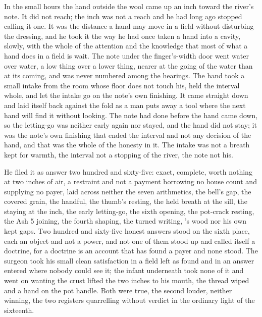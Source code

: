 In the small hours the hand outside the wool came up an inch toward the river's note. It did not reach; the inch was not a reach and he had long ago stopped calling it one. It was the distance a hand may move in a field without disturbing the dressing, and he took it the way he had once taken a hand into a cavity, slowly, with the whole of the attention and the knowledge that most of what a hand does in a field is wait. The note under the finger's-width door went water over water, a low thing over a lower thing, nearer at the going of the water than at its coming, and was never numbered among the hearings. The hand took a small intake from the room whose floor does not touch his, held the interval whole, and let the intake go on the note's own finishing. It came straight down and laid itself back against the fold as a man puts away a tool where the next hand will find it without looking. The note had done before the hand came down, so the letting-go was neither early again nor stayed, and the hand did not stay; it was the note's own finishing that ended the interval and not any decision of the hand, and that was the whole of the honesty in it. The intake was not a breath kept for warmth, the interval not a stopping of the river, the note not his.

He filed it as answer two hundred and sixty-five: exact, complete, worth nothing at two inches of air, a restraint and not a payment borrowing no house count and supplying no payer, laid across neither the seven arithmetics, the bell's gap, the covered grain, the handful, the thumb's resting, the held breath at the sill, the staying at the inch, the early letting-go, the sixth opening, the pot-crack resting, the Ash 5 joining, the fourth shaping, the turned writing, 's wood nor his own kept gaps. Two hundred and sixty-five honest answers stood on the sixth place, each an object and not a power, and not one of them stood up and called itself a doctrine, for a doctrine is an account that has found a payer and none stood. The surgeon took his small clean satisfaction in a field left as found and in an answer entered where nobody could see it; the infant underneath took none of it and went on wanting the crust lifted the two inches to his mouth, the thread wiped and a hand on the pot handle. Both were true, the second louder, neither winning, the two registers quarrelling without verdict in the ordinary light of the sixteenth.

